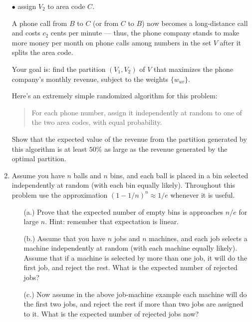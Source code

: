 \documentclass[12pt]{article}
\begin{document}
\begin{enumerate}
$\bullet$ assign $V_2$ to area code $C$.

A phone call from $B$ to $C$ (or from $C$ to $B$)
now becomes a long-distance call and
costs $c_2$ cents per minute --- thus,
the phone company stands to make more money per month on
phone calls among numbers in the set $V$
after it splits the area code.

Your goal is: find the partition $(V_1, V_2)$ of $V$
that maximizes the phone company's monthly revenue,
subject to the weights $\{w_{uv}\}$.

Here's an extremely simple randomized algorithm for this problem:
\begin{quote}
For each phone number, assign it independently at random
to one of the two area codes, with equal probability.
\end{quote}
Show that the expected value of the revenue from the partition
generated by this algorithm is at least $50\%$
as large as the revenue generated by the optimal partition.



\item 

Assume you have $n$ balls and $n$ 
bins, and each ball is placed in a bin 
selected independently at random (with each bin equally likely). 
Throughout this problem use the approximation $(1-1/n)^n \approx 1/e$ 
whenever it is useful.      
\begin{itemize}
\item[(a.)] Prove that the expected number of empty bins 
is approaches $n/e$ for large $n$. Hint: remember that 
expectation is linear.       
\item[(b.)] Assume that you have $n$ jobs and $n$ 
machines, and each job selects a machine independently at 
random (with each machine equally likely). Assume that if 
a machine is selected by more than one job, 
it will do the first job, and reject the 
rest. What is the expected number of rejected jobs? 
\item[(c.)] Now assume in the above job-machine example each 
machine will do the first two jobs, and reject 
the rest if more than two jobs are assigned 
to it. What is the expected number of rejected 
jobs now?        
\end{itemize}


\end{enumerate}
\end{document}
